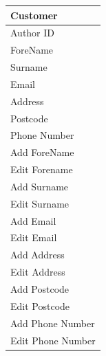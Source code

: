 \begin{tabular}{|p{2.5cm}|}
    \hline
    \textbf{Customer} \\ \hline
    Author ID \\ ForeName \\ Surname \\ Email \\ Address \\ Postcode \\ Phone Number \\ \hline
    Add ForeName \\ Edit Forename \\ Add Surname \\ Edit Surname \\ Add Email \\ Edit Email \\ Add Address \\ Edit Address \\ Add Postcode \\ Edit Postcode \\ Add Phone Number \\ Edit Phone Number \\ \hline
    \hline
\end{tabular}

